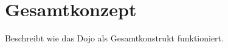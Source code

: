 \section{Gesamtkonzept}\label{sec:gesamtkonzept}

Beschreibt wie das Dojo als Gesamtkonstrukt funktioniert.
